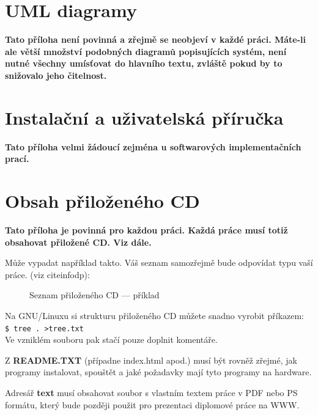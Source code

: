 \documentclass[11pt,twoside,a4paper]{book}
\begin{document}
\chapter{UML diagramy}
\textbf{\large Tato příloha není povinná a zřejmě se neobjeví v každé práci. Máte-li ale větší množství podobných diagramů popisujících systém, není nutné všechny umísťovat do hlavního textu, zvláště pokud by to snižovalo jeho čitelnost.}

\chapter{Instalační a uživatelská příručka}
\textbf{\large Tato příloha velmi žádoucí zejména u softwarových implementačních prací.}

\chapter{Obsah přiloženého CD}
\textbf{\large Tato příloha je povinná pro každou práci. Každá práce musí totiž obsahovat přiložené CD. Viz dále.}

Může vypadat například takto. Váš seznam samozřejmě bude odpovídat typu vaší práce. (viz cite{infodp}):

\begin{figure}[h]
\begin{center}
\caption{Seznam přiloženého CD --- příklad}
\end{center}
\end{figure}

Na GNU/Linuxu si strukturu přiloženého CD můžete snadno vyrobit příkazem:\\ 
\verb|$ tree . >tree.txt|\\
Ve vzniklém souboru pak stačí pouze doplnit komentáře.

Z \textbf{README.TXT} (případne index.html apod.)  musí být rovněž zřejmé, jak programy instalovat, spouštět a jaké požadavky mají tyto programy na hardware.

Adresář \textbf{text}  musí obsahovat soubor s vlastním textem práce v PDF nebo PS formátu, který bude později použit pro prezentaci diplomové práce na WWW.
\end{document}
